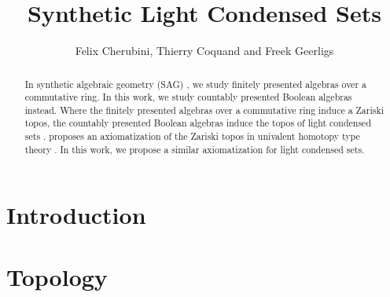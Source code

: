 \documentclass{../util/zariski-small}
\title{Synthetic Light Condensed Sets}
\theoremstyle{break}
\begin{document}
\author{Felix Cherubini, Thierry Coquand and Freek Geerligs}

\maketitle

\begin{abstract}
In synthetic algebraic geometry (SAG) \cite{draft}, we study finitely presented algebras over a commutative ring. 
In this work, we study countably presented Boolean algebras instead. 
Where the finitely presented algebras over a commutative ring induce a Zariski topos, 
the countably presented Boolean algebras induce the topos of light condensed sets \cite{Scholze}. 
\cite{draft} proposes an axiomatization of the Zariski topos in univalent homotopy type theory \cite{HoTT}. 
In this work, we propose a similar axiomatization for light condensed sets. 
\end{abstract} 

\section*{Introduction}


\section{Topology}



\printbibliography
\end{document}
